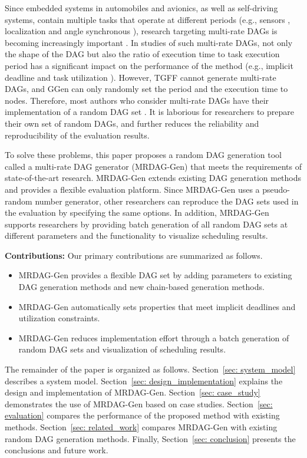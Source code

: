 Since embedded systems in automobiles and avionics, as well as self-driving systems, contain multiple tasks that operate at different periods (e.g., sensors \cite{guanindustry}, localization \cite{verucchi2020latency} and angle synchronous \cite{hamann2017communication}), research targeting multi-rate DAGs is becoming increasingly important \cite{gunzel2021suspension, kordon2020evaluation}.
In studies of such multi-rate DAGs, not only the shape of the DAG but also the ratio of execution time to task execution period has a significant impact on the performance of the method (e.g., implicit deadline \cite{ueter2021hard, cho2021conditionally} and task utilization \cite{nogd2020response, yang2020mixed}).
However, TGFF cannot generate multi-rate DAGs, and GGen can only randomly set the period and the execution time to nodes.
Therefore, most authors who consider multi-rate DAGs have their implementation of a random DAG set \cite{voronov2021ai, dong2019efficient, yang2020mixed, nogd2020response}.
It is laborious for researchers to prepare their own set of random DAGs, and further reduces the reliability and reproducibility of the evaluation results.

To solve these problems, this paper proposes a random DAG generation tool called a multi-rate DAG generator (MRDAG-Gen) that meets the requirements of state-of-the-art research.
MRDAG-Gen extends existing DAG generation methods and provides a flexible evaluation platform.
Since MRDAG-Gen uses a pseudo-random number generator, other researchers can reproduce the DAG sets used in the evaluation by specifying the same options.
In addition, MRDAG-Gen supports researchers by providing batch generation of all random DAG sets at different parameters and the functionality to visualize scheduling results.

\textbf{Contributions: } Our primary contributions are summarized as follows.
\begin{itemize}
    \item MRDAG-Gen provides a flexible DAG set by adding parameters to existing DAG generation methods and new chain-based generation methods.
    \item MRDAG-Gen automatically sets properties that meet implicit deadlines and utilization constraints.
    \item MRDAG-Gen reduces implementation effort through a batch generation of random DAG sets and visualization of scheduling results.
\end{itemize}

The remainder of the paper is organized as follows.
Section~\ref{sec: system_model} describes a system model.
Section~\ref{sec: design_implementation} explains the design and implementation of MRDAG-Gen.
Section~\ref{sec: case_study} demonstrates the use of MRDAG-Gen based on case studies.
Section~\ref{sec: evaluation} compares the performance of the proposed method with existing methods.
Section~\ref{sec: related_work} compares MRDAG-Gen with existing random DAG generation methods.
Finally, Section~\ref{sec: conclusion} presents the conclusions and future work.
